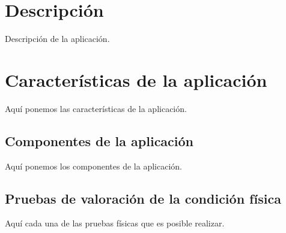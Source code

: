 

\section{Descripción}

Descripción de la aplicación.

\section{Características de la aplicación}

Aquí ponemos las características de la aplicación.

\subsection{Componentes de la aplicación}

Aquí ponemos los componentes de la aplicación.

\subsection{Pruebas de valoración de la condición física}

Aquí cada una de las pruebas físicas que es posible realizar.